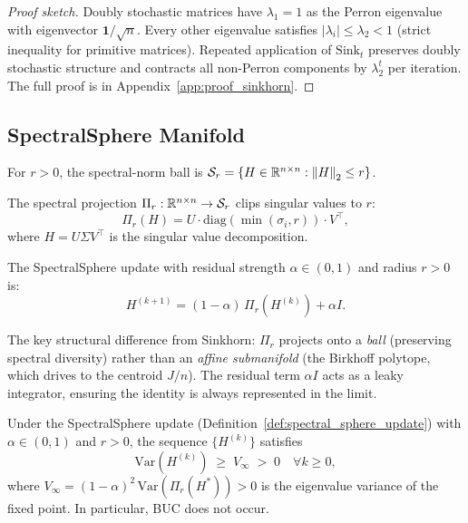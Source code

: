 \begin{proof}[Proof sketch]
  Doubly stochastic matrices have $\lambda_1 = 1$ as the Perron eigenvalue with
  eigenvector $\mathbf{1}/\sqrt{n}$.  Every other eigenvalue satisfies $|\lambda_i| \leq
  \lambda_2 < 1$ (strict inequality for primitive matrices).  Repeated application of
  $\mathrm{Sink}_t$ preserves doubly stochastic structure and contracts all non-Perron
  components by $\lambda_2^t$ per iteration.  The full proof is in
  Appendix~\ref{app:proof_sinkhorn}.
\end{proof}

\subsection{SpectralSphere Manifold}

\begin{definition}
  For $r > 0$, the spectral-norm ball is
  $\mathcal{S}_r = \{H \in \mathbb{R}^{n \times n} : \left\|H\right\|_2 \leq r\}$.
\end{definition}

\begin{definition}
  \label{def:spectral_proj}
  The spectral projection $\Pi_r : \mathbb{R}^{n \times n} \to \mathcal{S}_r$ clips singular
  values to $r$:
  \[
    \Pi_r(H) = U \cdot \mathrm{diag}\!\left(\min(\sigma_i, r)\right) \cdot V^\top,
  \]
  where $H = U \Sigma V^\top$ is the singular value decomposition.
\end{definition}

\begin{definition}
  \label{def:spectral_sphere_update}
  The SpectralSphere update with residual strength $\alpha \in (0,1)$ and radius $r > 0$
  is:
  \[
    H^{(k+1)} = (1 - \alpha)\,\Pi_r\!\left(H^{(k)}\right) + \alpha I.
  \]
\end{definition}

The key structural difference from Sinkhorn: $\Pi_r$ projects onto a \emph{ball}
(preserving spectral diversity) rather than an \emph{affine submanifold} (the Birkhoff
polytope, which drives to the centroid $J/n$).  The residual term $\alpha I$ acts as a
leaky integrator, ensuring the identity is always represented in the limit.

\begin{theorem}
  \label{thm:spectral_sphere_prevents_collapse}
  Under the SpectralSphere update (Definition~\ref{def:spectral_sphere_update}) with
  $\alpha \in (0,1)$ and $r > 0$, the sequence $\{H^{(k)}\}$ satisfies
  \[
    \mathrm{Var}\!\left(H^{(k)}\right) \;\geq\; V_\infty \;>\; 0 \quad \forall k \geq 0,
  \]
  where $V_\infty = (1-\alpha)^2\,\mathrm{Var}\!\left(\Pi_r(H^*)\right) > 0$ is the
  eigenvalue variance of the fixed point.  In particular, BUC does not occur.
\end{theorem}

